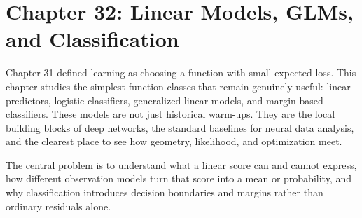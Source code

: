 \section{Chapter 32: Linear Models, GLMs, and Classification}
\label{ch:linear-models-glms-classification}

Chapter 31 defined learning as choosing a function with small expected loss. This chapter studies the simplest function classes that remain genuinely useful: linear predictors, logistic classifiers, generalized linear models, and margin-based classifiers. These models are not just historical warm-ups. They are the local building blocks of deep networks, the standard baselines for neural data analysis, and the clearest place to see how geometry, likelihood, and optimization meet.

The central problem is to understand what a linear score can and cannot express, how different observation models turn that score into a mean or probability, and why classification introduces decision boundaries and margins rather than ordinary residuals alone.


